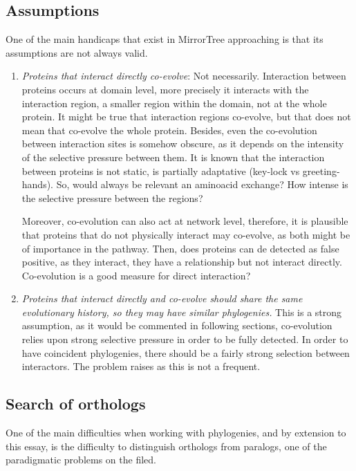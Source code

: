 \documentclass[11pt]{article}
\begin{document}
\subsection{Assumptions}
One of the main handicaps that exist in MirrorTree approaching is that its assumptions are not always valid.
\begin{enumerate}
\setlength{\itemsep}{1pt}
	\item \textit{Proteins that interact directly co-evolve}: Not necessarily. Interaction between proteins 		occurs at domain level, more precisely it interacts with the interaction region, a smaller region within 		the domain, not at the whole protein. It might be true that interaction regions co-evolve, but that does 		not mean that co-evolve the whole protein. Besides, even the co-evolution between interaction sites is 		somehow obscure, as it depends on the intensity of the selective pressure between them. It is known that 		the interaction between proteins is not static, is partially adaptative (key-lock vs greeting-hands). So, 	would always be relevant an aminoacid exchange? How intense is the selective pressure between the 			regions?

	Moreover, co-evolution can also act at network level, therefore, it is plausible that proteins that do 		not physically interact may co-evolve, as both might be of importance in the pathway. Then, does proteins 	can de detected as false positive, as they interact, they have a relationship but not interact directly. 		Co-evolution is a good measure for direct interaction?

	\item \textit{Proteins that interact directly and co-evolve should share the same evolutionary history, 		so they may have similar phylogenies.} This is a strong assumption, as it would be commented in following		sections, co-evolution relies upon strong selective pressure in order to be fully detected. In order to 		have coincident phylogenies, there should be a fairly strong selection between interactors. The problem 		raises as this is not a frequent.
\end{enumerate}

\subsection{Search of orthologs}
One of the main difficulties when working with phylogenies, and by extension to this essay, is the difficulty to distinguish orthologs from paralogs, one of the paradigmatic problems on the filed. 
\end{document}
